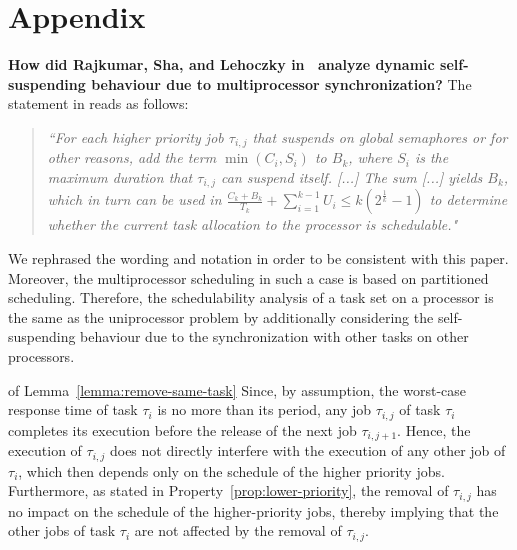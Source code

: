 \newpage
\section*{Appendix}
{\bf How did Rajkumar, Sha, and Lehoczky
  in~\cite[p. 267]{DBLP:conf/rtss/RajkumarSL88} analyze dynamic
  self-suspending behaviour due to multiprocessor synchronization?}
The statement in \cite{DBLP:conf/rtss/RajkumarSL88} reads as follows:
\begin{quote}
\emph{``For each higher priority job $\tau_{i,j}$ that suspends on global semaphores or for other reasons, add the term $\min(C_i, S_i)$ to $B_k$, where $S_i$ is the maximum duration that $\tau_{i,j}$ can suspend itself. [...] The sum [...] yields $B_k$, which in turn can be used in 
$\frac{C_k+B_k}{T_k} + \sum_{i=1}^{k-1} U_i \leq k (2^{\frac{1}{k}}-1)$ to determine whether the current task allocation to the processor is schedulable."}
\end{quote}
  We rephrased the wording and notation in order to be consistent with this paper. Moreover, the multiprocessor scheduling in such a case is based on partitioned scheduling. Therefore, the schedulability analysis of a task set on a processor is the same as the uniprocessor problem by additionally considering the self-suspending behaviour due to the synchronization with other tasks on other processors.

\begin{appProof}{of Lemma~\ref{lemma:remove-same-task}}
Since, by assumption, the worst-case response time of task $\tau_i$ is no more than its period, any job $\tau_{i,j}$ of task $\tau_i$ completes its execution before the release of the next job $\tau_{i,j+1}$. Hence, the execution of $\tau_{i,j}$ does not directly interfere with the execution of any other job of $\tau_i$, which then depends only on the schedule of the higher priority jobs. Furthermore, as stated in Property~\ref{prop:lower-priority}, the removal of $\tau_{i,j}$ has no impact on the schedule of the higher-priority jobs, thereby implying that the other jobs of task $\tau_i$ are not affected by the removal of $\tau_{i,j}$.
\end{appProof}

